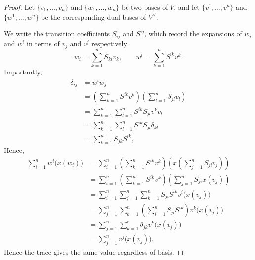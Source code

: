 \documentclass{article}
\begin{document}
\begin{proof}
    Let $\{v_1,\ldots,v_n\}$ and $\{w_1,\ldots,w_n\}$ be two bases of $V$, and let $\{v^1,\ldots,v^n\}$ and $\{w^1,\ldots,w^n\}$ be the corresponding dual bases of $V^\vee$.

    We write the transition coefficients $S_{ij}$ and $S^{ij}$, which record the expansions of $w_i$ and $w^i$ in terms of $v_j$ and $v^j$ respectively.
    \[
        w_i
        =
        \sum_{k=1}^n
        S_{ki}v_k
        ,\qquad
        w^i
        =
        \sum_{k=1}^n
        S^{ik}v^k.
    \]
    Importantly,
    \begin{align*}
        \delta_{ij}
        &=
        w^iw_j
        \\
        &=
        \left(
            \sum_{k=1}^n
            S^{ik}v^k
        \right)
        \left(
            \sum_{l=1}^n
            S_{jl}v_l
        \right)
        \\
        &=
        \sum_{k=1}^n
        \sum_{l=1}^n
        S^{ik}S_{jl}
        v^kv_l
        \\
        &=
        \sum_{k=1}^n
        \sum_{l=1}^n
        S^{ik}S_{jl}
        \delta_{kl}
        \\
        &=
        \sum_{k=1}^n
        S_{jk}S^{ik},
    \end{align*}
    Hence,
    \begin{align*}
        \sum_{i=1}^n
        w^i\Big(x(w_i)\Big)
        &=
        \sum_{i=1}^n
        \left(
            \sum_{k=1}^n
            S^{ik}v^k
        \right)
        \left(
            x
            \left(
                \sum_{j=1}^n
                S_{ji}v_j
            \right)
        \right)
        \\
        &=
        \sum_{i=1}^n
        \left(
            \sum_{k=1}^n
            S^{ik}v^k
        \right)
        \left(
            \sum_{j=1}^n
            S_{ji}x(v_j)
        \right)
        \\
        &=
        \sum_{i=1}^n
        \sum_{j=1}^n
        \sum_{k=1}^n
        S_{ji}S^{ik}
        v^i\Big(x(v_j)\Big)
        \\
        &=
        \sum_{j=1}^n
        \sum_{k=1}^n
        \left(
            \sum_{i=1}^n
            S_{ji}S^{ik}
        \right)
        v^k\Big(x(v_j)\Big)
        \\
        &=
        \sum_{j=1}^n
        \sum_{k=1}^n
        \delta_{jk}
        v^k\Big(x(v_j)\Big)
        \\
        &=
        \sum_{j=1}^n
        v^j\Big(x(v_j)\Big).
    \end{align*}
    Hence the trace gives the same value regardless of basis.
\end{proof}
\end{document}
